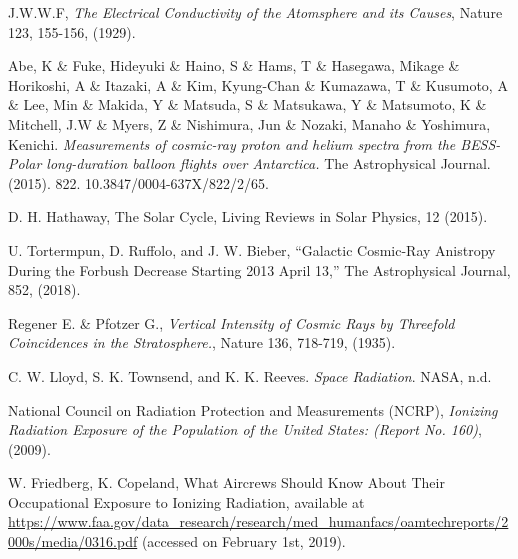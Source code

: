 




\begin{thebibliography}{00}

  J.W.W.F, \textit{The Electrical Conductivity of the Atomsphere and its Causes}, Nature 123, 155-156, (1929).

  Abe, K \& Fuke, Hideyuki \& Haino, S \& Hams, T \& Hasegawa, Mikage \& Horikoshi, A \& Itazaki, A \& Kim, Kyung-Chan \& Kumazawa, T \& Kusumoto, A \& Lee, Min \& Makida, Y \& Matsuda, S \& Matsukawa, Y \& Matsumoto, K \& Mitchell, J.W \& Myers, Z \& Nishimura, Jun \& Nozaki, Manaho \& Yoshimura, Kenichi. \textit{Measurements of cosmic-ray proton and helium spectra from the BESS-Polar long-duration balloon flights over Antarctica.} The Astrophysical Journal. (2015). 822. 10.3847/0004-637X/822/2/65. 

  D. H. Hathaway, The Solar Cycle, Living Reviews in Solar Physics, 12 (2015).

  U. Tortermpun, D. Ruffolo, and J. W. Bieber, “Galactic Cosmic-Ray Anistropy During the Forbush Decrease Starting 2013 April 13,” The Astrophysical Journal, 852, (2018).
  
  Regener E. \& Pfotzer G., \textit{Vertical Intensity of Cosmic Rays by Threefold Coincidences in the Stratosphere.}, Nature 136, 718-719, (1935). 

  C. W. Lloyd, S. K. Townsend, and K. K. Reeves. \textit{Space Radiation}. NASA, n.d.

National Council on Radiation Protection and Measurements (NCRP), \textit{Ionizing Radiation Exposure of the Population of the United States: (Report No. 160)}, (2009).
  
  W. Friedberg, K. Copeland, What Aircrews Should Know About Their Occupational Exposure to Ionizing Radiation, available at \url{https://www.faa.gov/data_research/research/med_humanfacs/oamtechreports/2000s/media/0316.pdf} (accessed on February 1st, 2019).
    

\end{thebibliography}
